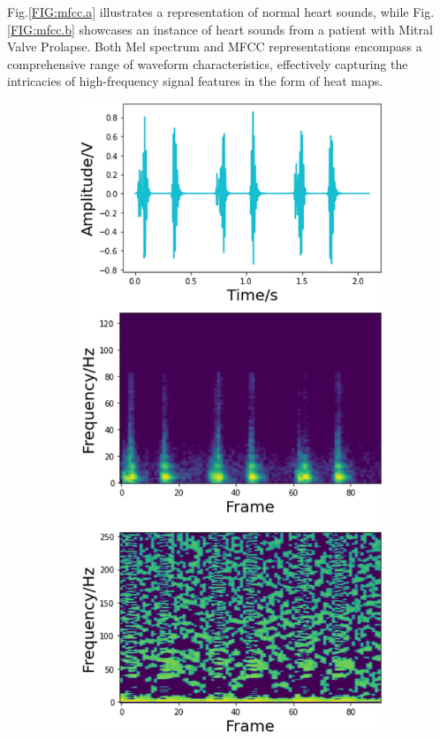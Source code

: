 Fig.\ref{FIG:mfcc.a} illustrates a representation of normal heart sounds, while Fig.\ref{FIG:mfcc.b} showcases an instance of heart sounds from a patient with Mitral Valve Prolapse. Both Mel spectrum and MFCC representations encompass a comprehensive range of waveform characteristics, effectively capturing the intricacies of high-frequency signal features in the form of heat maps.
\begin{figure}[!h]
\centering
    \begin{subfigure}{.48\linewidth}
        \centering
        \includegraphics[width=0.99\linewidth]{figs/results/n_mfcc.png}

\end{subfigure}
\end{figure}
